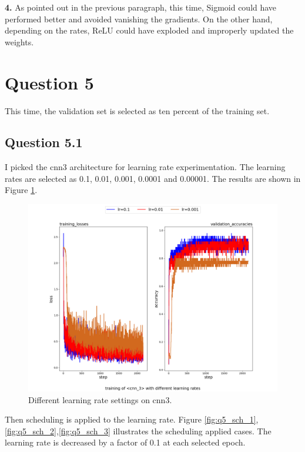 \documentclass{assignment}
\begin{document}
\textbf{4.}
\noindent As pointed out in the previous paragraph, this time, Sigmoid could have performed better and avoided vanishing the gradients. On the other hand, depending on the rates, ReLU could have exploded and improperly updated the weights.

\section{Question 5}
This time, the validation set is selected as ten percent of the training set.

\subsection*{Question 5.1}
I picked the cnn3 architecture for learning rate experimentation. The learning rates are selected as 0.1, 0.01, 0.001, 0.0001 and 0.00001. The results are shown in Figure \ref{fig:q5}.


\begin{figure}[!htb]
    \centering
    \includegraphics[width=1\textwidth]{figures/q5_1.png}
    \caption{Different learning rate settings on cnn3.}
    \label{fig:q5}
\end{figure}

\noindent Then scheduling is applied to the learning rate. Figure \ref{fig:q5_sch_1},\ref{fig:q5_sch_2},\ref{fig:q5_sch_3} illustrates the scheduling applied cases. The learning rate is decreased by a factor of 0.1 at each selected epoch.
\end{document}
